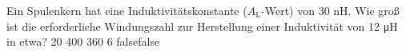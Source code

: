     {Ein Spulenkern hat eine Induktivitätskonstante ($A_{\textrm{L}}$-Wert) von 30 nH. Wie groß ist die erforderliche Windungszahl zur Herstellung einer Induktivität von 12 \si{\micro\henry} in etwa?}
    {20}
    {400}
    {360}
    {6}
    {false}{false}